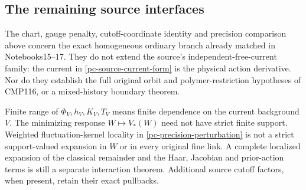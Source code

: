 \subsection{The remaining source interfaces}
\label{pc-scope}

The chart, gauge penalty, cutoff-coordinate identity and
precision comparison above concern the exact homogeneous
ordinary branch already matched in Notebooks15--17. They
do not extend the source's independent-free-current family:
the current in \eqref{pc-source-current-form} is the physical
action derivative. Nor do they establish the full original
orbit and polymer-restriction hypotheses of CMP116, or a
mixed-history boundary theorem.

Finite range of $\Phi_V,h_V,K_V,T_V$ means finite dependence
on the current background $V$. The minimizing response
$W\mapsto V_*(W)$ need not have strict finite support.
Weighted fluctuation-kernel locality in
\eqref{pc-precision-perturbation} is not a strict
support-valued expansion in $W$ or in every original fine
link. A complete localized expansion of the classical
remainder and the Haar, Jacobian and prior-action terms is
still a separate interaction theorem. Additional source
cutoff factors, when present, retain their exact pullbacks.
